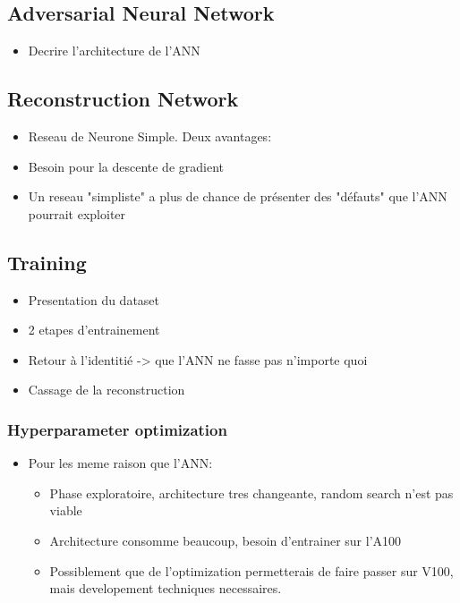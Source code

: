 \documentclass[../main.tex]{subfiles}
\begin{document}
\subsection{Adversarial Neural Network}
\label{sec:janne:arch:ann}
\begin{itemize}
  \item Decrire l'architecture de l'ANN
\end{itemize}

\subsection{Reconstruction Network}
\label{sec:janne:arch:reco}
\begin{itemize}
  \item Reseau de Neurone Simple. Deux avantages:
  \item Besoin pour la descente de gradient
  \item Un reseau "simpliste" a plus de chance de présenter des "défauts" que l'ANN pourrait exploiter
\end{itemize}

\subsection{Training}
\label{sec:janne:arch:training}
\begin{itemize}
  \item Presentation du dataset
  \item 2 etapes d'entrainement
  \item Retour à l'identitié -> que l'ANN ne fasse pas n'importe quoi
  \item Cassage de la reconstruction
\end{itemize}

\subsubsection{Hyperparameter optimization}
\label{sec:janne:arch:hyper}
\begin{itemize}
  \item Pour les meme raison que l'ANN:
    \begin{itemize}
      \item Phase exploratoire, architecture tres changeante, random search n'est pas viable
      \item Architecture consomme beaucoup, besoin d'entrainer sur l'A100
      \item Possiblement que de l'optimization permetterais de faire passer sur V100, mais developement techniques necessaires.
    \end{itemize}
\end{itemize}
\end{document}
